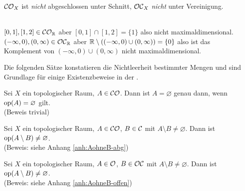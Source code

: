     \begin{bem}
    $\mathcal{CO}_X$ ist \textit{nicht} abgeschlossen unter Schnitt, $\mathcal{OC}_X$ \textit{nicht} unter Vereinigung.
    \end{bem}

    \begin{gegenbsp}\ \\
    ${[0,1], [1,2] \in \mathcal{CO}_{\mathbb{R}}}$ aber ${[0,1] \cap [1,2] = \{1\}}$ also nicht maximaldimensional.\\
    ${(-\infty,0), (0,\infty) \in \mathcal{OC}_{\mathbb{R}}}$ aber ${\mathbb{R} \setminus ((-\infty,0) \cup (0,\infty)) = \{0\}}$ also ist das Komplement von ${(-\infty,0) \cup (0,\infty)}$ nicht maximaldimensional.
    \end{gegenbsp}



    Die folgenden Sätze konstatieren die Nichtleerheit bestimmter Mengen und sind Grundlage für einige Existenzbeweise in der \strukt.

    \begin{satz}\label{satz:Aleer}
        Sei $X$ ein topologischer Raum, $A \in \mathcal{CO}$. Dann ist $A = \varnothing$ genau dann, wenn $\text{op}(A) = \varnothing$ gilt.\\
        (Beweis trivial)
    \end{satz}


    \begin{satz}\label{satz:AohneB-abg}
        Sei $X$ ein topologischer Raum, $A \in \mathcal{CO}$, $B \in \mathcal{C}$ mit $A \setminus B \neq \varnothing$. Dann ist $\text{op}(A \setminus B) \neq \varnothing$.\\
        (Beweis: siehe Anhang \ref{anh:AohneB-abg})
    \end{satz}
    
    
    \begin{satz}\label{satz:AohneB-offen}
        Sei $X$ ein topologischer Raum, $A \in \mathcal{O}$, $B \in \mathcal{OC}$ mit $A \setminus B \neq \varnothing$. Dann ist $\text{op}(A \setminus B) \neq \varnothing$.\\
        (Beweis: siehe Anhang \ref{anh:AohneB-offen})
    \end{satz}

